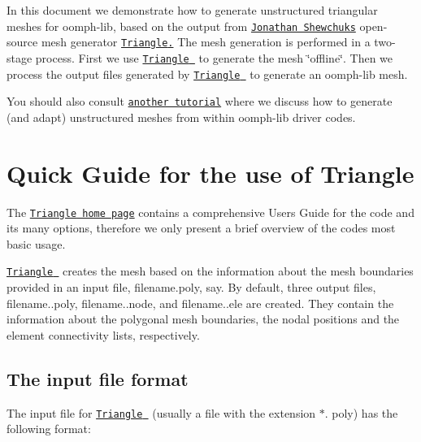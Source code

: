 In this document we demonstrate how to generate unstructured triangular meshes for {\ttfamily oomph-\/lib}, based on the output from \href{http://www.cs.berkeley.edu/~jrs/}{\tt Jonathan Shewchuk\textquotesingle{}s} open-\/source mesh generator \href{http://www.cs.cmu.edu/~quake/triangle.html}{\tt {\ttfamily Triangle}.} The mesh generation is performed in a two-\/stage process. First we use \href{http://www.cs.cmu.edu/~quake/triangle.html}{\tt {\ttfamily Triangle} } to generate the mesh \char`\"{}offline\char`\"{}. Then we process the output files generated by \href{http://www.cs.cmu.edu/~quake/triangle.html}{\tt {\ttfamily Triangle} } to generate an {\ttfamily oomph-\/lib} mesh.

You should also consult \href{../../../../doc/meshes/mesh_from_inline_triangle/html/index.html}{\tt another tutorial} where we discuss how to generate (and adapt) unstructured meshes from within {\ttfamily oomph-\/lib} driver codes.



 

\hypertarget{index_triangle_use}{}\section{Quick Guide for the use of Triangle}\label{index_triangle_use}
The \href{http://www.cs.cmu.edu/~quake/triangle.html}{\tt {\ttfamily Triangle} home page} contains a comprehensive User\textquotesingle{}s Guide for the code and its many options, therefore we only present a brief overview of the code\textquotesingle{}s most basic usage.

\href{http://www.cs.cmu.edu/~quake/triangle.html}{\tt {\ttfamily Triangle} } creates the mesh based on the information about the mesh boundaries provided in an input file, {\ttfamily filename.\+poly}, say. By default, three output files, {\ttfamily filename..\+poly}, {\ttfamily filename..\+node}, and {\ttfamily filename..\+ele} are created. They contain the information about the polygonal mesh boundaries, the nodal positions and the element connectivity lists, respectively.



\hypertarget{index_input}{}\subsection{The input file format}\label{index_input}
The input file for \href{http://www.cs.cmu.edu/~quake/triangle.html}{\tt {\ttfamily Triangle} } (usually a file with the extension {\ttfamily $\ast$}. {\ttfamily poly}) has the following format\+:

